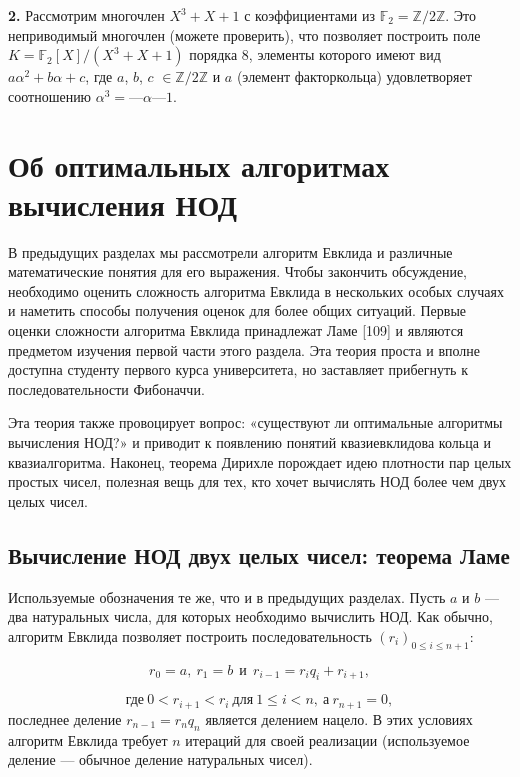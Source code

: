 \documentclass{mai_book}
\begin{document}
\textbf{2.}  Рассмотрим многочлен $X^3 + X + 1$ с коэффициентами из 
$\mathbb{F}_2 = \mathbb{Z}\slash 2\mathbb{Z}$. Это неприводимый многочлен (можете проверить), что  
позволяет построить поле $K = \mathbb{F}_2[X]\slash(X^3 + X + 1)$ порядка 8, элементы 
которого имеют вид $a\alpha^2 + b\alpha + c$, где $a$, $b$, $c$ $\in \mathbb{Z}/2\mathbb{Z}$ и $a$ (элемент 
факторкольца) удовлетворяет соотношению $\alpha^3 = —\alpha — 1$.

\section{ Об оптимальных алгоритмах вычисления НОД}
В предыдущих разделах мы рассмотрели алгоритм Евклида и  
различные математические понятия для его выражения. Чтобы закончить 
обсуждение, необходимо оценить сложность алгоритма Евклида в  
нескольких особых случаях и наметить способы получения оценок для 
более общих ситуаций. Первые оценки сложности алгоритма Евклида 
принадлежат Ламе [109] и являются предметом изучения первой части 
этого раздела. Эта теория проста и вполне доступна студенту первого 
курса университета, но заставляет прибегнуть к последовательности 
Фибоначчи.
 
Эта теория также провоцирует вопрос: «существуют ли  
оптимальные алгоритмы вычисления НОД?» и приводит к появлению понятий 
квазиевклидова кольца и квазиалгоритма. Наконец, теорема Дирихле 
порождает идею плотности пар целых простых чисел, полезная вещь 
для тех, кто хочет вычислять НОД более чем двух целых чисел. 
 
\subsection{Вычисление НОД двух целых чисел: теорема Ламе}
Используемые обозначения те же, что и в предыдущих разделах. Пусть 
$a$ и $b$ — два натуральных числа, для которых необходимо вычислить 
НОД. Как обычно, алгоритм Евклида позволяет построить  
последовательность $(r_i)_{0 \leq i \leq n+1}$:

\begin{equation*}
r_0 = a,\: r_1 = b \:\: \text{и} \:\: r_{i-1} = r_i q_i + r_{i+1},
\end{equation*}
\newpage

\begin{equation*}
\text{где}\: 0 < r_{i+1} < r_i \: \text{для}\: 1 \leq i < n,\: \text{а}\: r_{n+1} = 0,
\end{equation*}
последнее деление $r_{n-1} = r_n q_n$ является делением нацело. В этих  
условиях алгоритм Евклида требует $n$ итераций для своей реализации 
(используемое деление — обычное деление натуральных чисел). 
\end{document}
